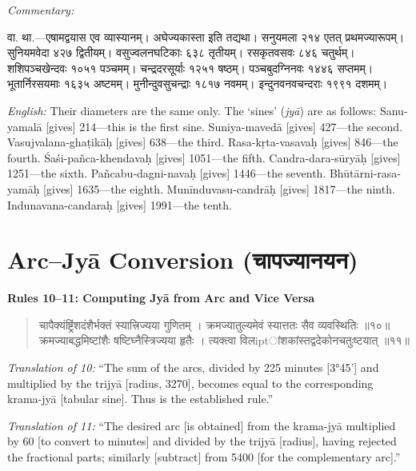 \documentclass[11pt,a4paper]{book}
\newcommand{\dev}[1]{{\devanagarifont #1}}
\newenvironment{shloka}{%
  \begin{verse}
  \devanagarifont\color{versecolor}%
}{\end{verse}}
\newenvironment{vasaanaskt}{%
  \par\vspace{0.5em}\noindent\small\textit{Commentary:}%
}{\par\vspace{0.5em}}
\newcommand{\ruleheading}[1]{%
  \par\vspace{0.8em}\noindent\textbf{\color{sectioncolor}#1}\par\vspace{0.3em}%
}
\begin{document}
\begin{vasaanaskt}
\dev{वा. था.}---एषामद्वयास एव व्यास्यानम्। अघेज्यकास्ता इति तद्यथा। सनुयमला २१४ एतत् प्रथमज्यारूपम्। सुनियमवेदा ४२७ द्वितीयम्। वसुज्वलनघटिकाः ६३८ तृतीयम्। रसकृतवसवः ८४६ चतुर्थम्। शशिपञ्चखेन्दवः १०५१ पञ्चमम्। चन्द्रदरसूर्याः १२५१ षष्ठम्। पञ्चबुदग्निनवः १४४६ सप्तमम्। भूतार्निरसयमाः १६३५ अष्टमम्। मुनीन्दुवसुचन्द्राः १८१७ नवमम्। इन्दुनवनवचन्दराः १९९१ दशमम्।

\textit{English:} Their diameters are the same only. The `sines' (\textit{jyā}) are as follows: Sanu-yamalā [gives] 214---this is the first sine. Suniya-mavedā [gives] 427---the second. Vasujvalana-ghaṭikāḥ [gives] 638---the third. Rasa-kṛta-vasavaḥ [gives] 846---the fourth. Śaśi-pañca-khendavaḥ [gives] 1051---the fifth. Candra-dara-sūryāḥ [gives] 1251---the sixth. Pañcabu-dagni-navaḥ [gives] 1446---the seventh. Bhūtārni-rasa-yamāḥ [gives] 1635---the eighth. Munīnduvasu-candrāḥ [gives] 1817---the ninth. Indunavana-candaraḥ [gives] 1991---the tenth.
\end{vasaanaskt}

\section{Arc--Jyā Conversion (\dev{चापज्यानयन})}

\ruleheading{Rules 10--11: Computing Jyā from Arc and Vice Versa}

\begin{shloka}
\begin{altverse}
\dev{चापैक्यंष्ट्रिंशदंशैर्भक्तं स्यात्त्रिज्यया गुणितम् ।}
\dev{क्रमज्यातुल्यमेवं स्यात्ततः सैव व्यवस्थितिः ॥१०॥}
\dev{क्रमज्याबद्धमिष्टांशैः षष्टिघ्नैस्त्रिज्यया हृतैः ।}
\dev{त्यक्त्वा विलiptांशकांस्तद्वदेकोनचतुःष्टयात् ॥११॥}
\end{altverse}
\end{shloka}

\textit{Translation of 10:} ``The sum of the arcs, divided by 225 minutes [3°45'] and multiplied by the trijyā [radius, 3270], becomes equal to the corresponding krama-jyā [tabular sine]. Thus is the established rule.''

\textit{Translation of 11:} ``The desired arc [is obtained] from the krama-jyā multiplied by 60 [to convert to minutes] and divided by the trijyā [radius], having rejected the fractional parts; similarly [subtract] from 5400 [for the complementary arc].''
\end{document}

